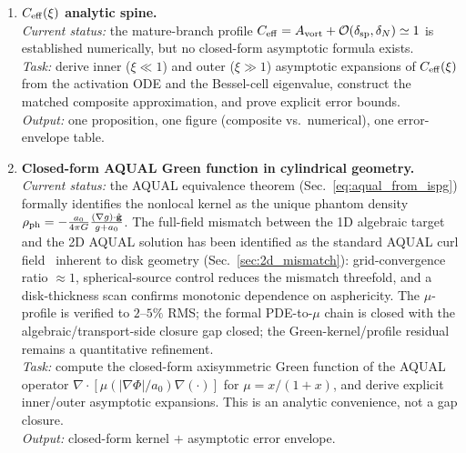\documentclass[11pt]{article}
\begin{document}
\begin{enumerate}

\item \textbf{$C_{\rm eff}(\xi)$ analytic spine.}\\
  \textit{Current status:} the mature-branch profile
  $C_{\rm eff}=A_{\rm vort}+\mathcal{O}(\delta_{\rm sp},\delta_N)
  \simeq1$ is established numerically, but no closed-form asymptotic
  formula exists.\\
  \textit{Task:} derive inner ($\xi\ll1$) and outer ($\xi\gg1$)
  asymptotic expansions of $C_{\rm eff}(\xi)$ from the activation
  ODE and the Bessel-cell eigenvalue, construct the matched composite
  approximation, and prove explicit error bounds.\\
  \textit{Output:} one proposition, one figure (composite vs.\
  numerical), one error-envelope table.

\item \textbf{Closed-form AQUAL Green function in cylindrical geometry.}\\
  \textit{Current status:} the AQUAL equivalence theorem
  (Sec.~\ref{eq:aqual_from_ispg}) formally identifies the
  nonlocal kernel as the unique phantom density
  $\rho_{\rm ph}=-\frac{a_0}{4\pi G}\frac{(\nabla g)\cdot
  \hat{\mathbf{g}}}{g+a_0}$.  The full-field mismatch between
  the 1D algebraic target and the 2D AQUAL solution has been
  identified as the standard AQUAL curl
  field~\cite{BradaMilgrom1999} inherent to disk geometry
  (Sec.~\ref{sec:2d_mismatch}): grid-convergence ratio
  $\approx1$, spherical-source control reduces the mismatch
  threefold, and a disk-thickness scan confirms monotonic
  dependence on asphericity.  The $\mu$-profile is verified to
  $2$--$5\%$ RMS; the formal PDE-to-$\mu$ chain is closed
  with the algebraic/transport-side closure gap closed; the
  Green-kernel/profile residual remains a quantitative refinement.\\
  \textit{Task:} compute the closed-form axisymmetric Green function
  of the AQUAL operator $\nabla\!\cdot\![\mu(|\nabla\Phi|/a_0)
  \nabla(\cdot)]$ for $\mu=x/(1+x)$, and derive explicit inner/outer
  asymptotic expansions.  This is an analytic convenience, not a
  gap closure.\\
  \textit{Output:} closed-form kernel $+$ asymptotic error envelope.


\end{enumerate}
\end{document}

